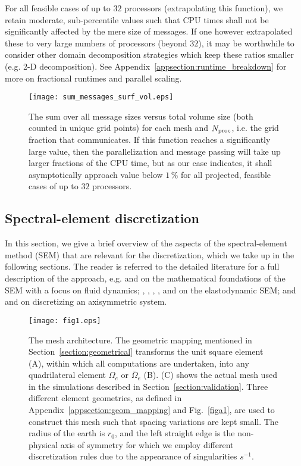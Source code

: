 \documentclass[11pt,letter,fleqn,english,notitlepage]{article}
\begin{document}
For all feasible cases of up to $32$ processors (extrapolating this function), 
we retain moderate, sub-percentile values such that CPU times shall not be 
significantly affected by the mere size of messages.
If one however extrapolated these to very large numbers of processors (beyond $32$), 
it may be worthwhile to consider other domain decomposition strategies 
which keep these ratios smaller (e.g. 2-D decomposition).
See Appendix~\ref{appsection:runtime_breakdown}
for more on fractional runtimes and parallel scaling.
%
\begin{figure}[t!]
\begin{center}
\texttt{[image: sum\_messages\_surf\_vol.eps]}
\caption{The sum over all message sizes versus total volume size 
(both counted in unique grid points) for each mesh and $N_{\rm proc}$, 
i.e. the grid fraction that communicates. 
If this function reaches a significantly large value, then the 
parallelization and message passing will take up larger fractions 
of the CPU time, but as our case indicates, it shall asymptotically 
approach value below $1\,\%$ for all projected, feasible cases of 
up to $32$ processors. }
\label{img:message_surf_vol}
\end{center}
\end{figure}
%
%
\subsection{Spectral-element discretization}
In this section, we give a brief overview of the aspects of the 
spectral-element method (SEM) that are relevant for the discretization, 
which we take up in the following sections. 
The reader is referred to the detailed literature
for a full description of the approach, e.g. \citet{dfm} and 
\citet{karniadakis} 
on the mathematical foundations of the SEM with a focus on fluid dynamics; 
\citet{KoVi98}, \citet{KoTr99}, \citet{KoTr02a}, \citet{manu03}, and 
\citet{Chaljub+:06} on the 
elastodynamic SEM; and \citet{bernardi} and \citet{fournier04} on 
discretizing an axisymmetric system.
%
%
\begin{figure}[htb!]
\begin{center}
\texttt{[image: fig1.eps]}
\caption{The mesh architecture. The geometric mapping mentioned in 
Section~\ref{section:geometrical} transforms the unit square element (A), 
within which all computations are undertaken, into any quadrilateral element 
$\Omega_e$ or $\bar{\Omega}_e$ (B). (C) shows the actual mesh used 
in the simulations described in Section~\ref{section:validation}. 
Three different element geometries, as defined in 
Appendix~\ref{appsection:geom_mapping} and 
Fig.~\ref{figa1}, are used to construct this mesh such that spacing 
variations are kept small. The radius of the earth is $r_0$, and 
the left straight edge is the non-physical axis of 
symmetry for which we employ different discretization rules due to the 
appearance of singularities $s^{-1}$.}
\label{fig1}
\end{center}
\end{figure}
%
\end{document}
